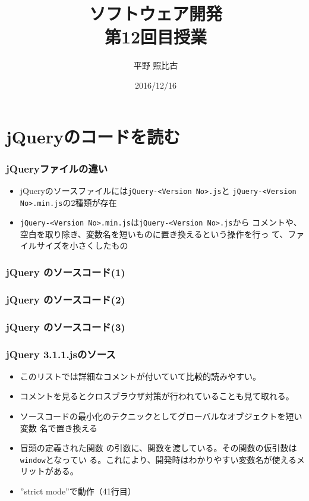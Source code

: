 
\title{ソフトウェア開発\\第12回目授業}
\author{平野 照比古}
\institute{}
\date{2016/12/16}
\newtheorem{Prob}{解説}
\newcommand{\Elm}[1]{\texttt{<#1>}}

\newcommand{\DOMM}{\texttt}
\newcommand{\Event}{\texttt}
\newcommand{\DOMP}{\texttt}
\newcommand{\DOM}{\texttt{DOM}}
\newcommand{\keyitem}{\relax}
\newcommand{\HTML}{HTML文書}

\frame{\maketitle}
\section{jQueryのコードを読む}
\begin{frame}[containsverbatim]
 \frametitle{jQueryファイルの違い}
\begin{itemize}
 \item jQueryのソースファイルには\texttt{jQuery-<Version No>.js}と
\texttt{jQuery-<Version No>.min.js}の2種類が存在
 \item \texttt{jQuery-<Version No>.min.js}は\texttt{jQuery-<Version No>.js}から
コメントや、空白を取り除き、変数名を短いものに置き換えるという操作を行っ
て、ファイルサイズを小さくしたもの
\end{itemize}
\end{frame}
\begin{frame}[containsverbatim]
 \frametitle{jQuery のソースコード(1)}
\end{frame}
\begin{frame}[containsverbatim]
 \frametitle{jQuery のソースコード(2)}
\end{frame}
\begin{frame}[containsverbatim]
 \frametitle{jQuery のソースコード(3)}
\end{frame}
\begin{frame}[containsverbatim]
 \frametitle{jQuery 3.1.1.jsのソース}
 \begin{itemize}
  \item このリストでは詳細なコメントが付いていて比較的読みやすい。
  \item コメントを見るとクロスブラウザ対策が行われていることも見て取れる。
  \item ソースコードの最小化のテクニックとしてグローバルなオブジェクトを短い変数
名で置き換える
  \item 冒頭の定義された関数
の引数に、関数を渡している。その関数の仮引数は\texttt{window}となってい
る。これにより、開発時はわかりやすい変数名が使えるメリットがある。
	\item ”strict mode”で動作（41行目）
 \end{itemize}
\end{frame}
